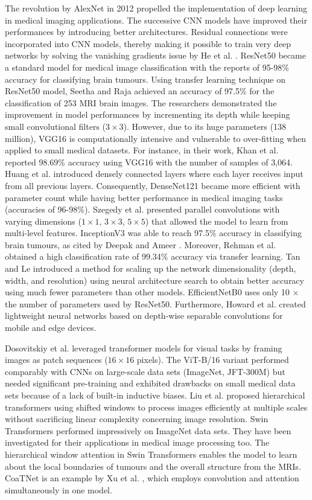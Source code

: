 \documentclass[final,3p,times,number]{elsarticle}
\begin{document}
The revolution by AlexNet in 2012 propelled the implementation of deep learning in medical imaging applications. The successive CNN models have improved their performances by introducing better architectures. Residual connections were incorporated into CNN models, thereby making it possible to train very deep networks by solving the vanishing gradients issue by He et al. \cite{ref6}. ResNet50 became a standard model for medical image classification with the reports of 95-98\% accuracy for classifying brain tumours. Using transfer learning technique on ResNet50 model, Seetha and Raja \cite{ref12} achieved an accuracy of 97.5\% for the classification of 253 MRI brain images. The researchers demonstrated the improvement in model performances by incrementing its depth while keeping small convolutional filters ($3\times 3$). However, due to its huge parameters (138 million), VGG16 is computationally intensive and vulnerable to over-fitting when applied to small medical datasets. For instance, in their work, Khan et al. \cite{ref23} reported 98.69\% accuracy using VGG16 with the number of samples of 3,064. Huang et al. \cite{ref9} introduced densely connected layers where each layer receives input from all previous layers. Consequently, DenseNet121 became more efficient with parameter count while having better performance in medical imaging tasks (accuracies of 96-98\%). Szegedy et al. \cite{ref7} presented parallel convolutions with varying dimensions ($1\times 1$, $3\times 3$, $5\times 5$) that allowed the model to learn from multi-level features. InceptionV3 was able to reach 97.5\% accuracy in classifying brain tumours, as cited by Deepak and Ameer \cite{ref15}. Moreover, Rehman et al. \cite{ref25} obtained a high classification rate of 99.34\% accuracy via transfer learning. Tan and Le \cite{ref18} introduced a method for scaling up the network dimensionality (depth, width, and resolution) using neural architecture search to obtain better accuracy using much fewer parameters than other models. EfficientNetB0 uses only 10 $\times$ the number of parameters used by ResNet50. Furthermore, Howard et al. \cite{ref19} created lightweight neural networks based on depth-wise separable convolutions for mobile and edge devices.

Dosovitskiy et al. \cite{ref28} leveraged transformer models for visual tasks by framing images as patch sequences ($16\times 16$ pixels). The ViT-B/16 variant performed comparably with CNNs on large-scale data sets (ImageNet, JFT-300M) but needed significant pre-training and exhibited drawbacks on small medical data sets because of a lack of built-in inductive biases. Liu et al. \cite{ref29} proposed hierarchical transformers using shifted windows to process images efficiently at multiple scales without sacrificing linear complexity concerning image resolution. Swin Transformers performed impressively on ImageNet data sets. They have been investigated for their applications in medical image processing too. The hierarchical window attention in Swin Transformers enables the model to learn about the local boundaries of tumours and the overall structure from the MRIs. CoaTNet is an example by Xu et al. \cite{ref30}, which employs convolution and attention simultaneously in one model.
\end{document}
